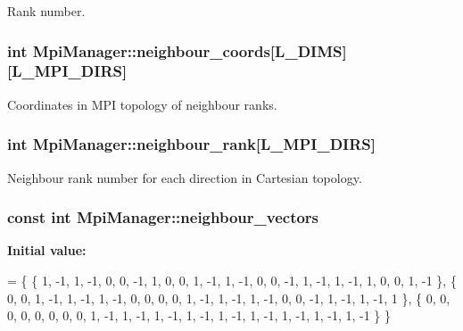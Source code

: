 Rank number. 

\subsubsection[{\texorpdfstring{neighbour\+\_\+coords}{neighbour_coords}}]{\setlength{\rightskip}{0pt plus 5cm}int Mpi\+Manager\+::neighbour\+\_\+coords\mbox{[}{\bf L\+\_\+\+D\+I\+MS}\mbox{]}\mbox{[}{\bf L\+\_\+\+M\+P\+I\+\_\+\+D\+I\+RS}\mbox{]}}\hypertarget{class_mpi_manager_a5a7268347fcab916adc61bee47e9f626}{}\label{class_mpi_manager_a5a7268347fcab916adc61bee47e9f626}


Coordinates in M\+PI topology of neighbour ranks. 

\subsubsection[{\texorpdfstring{neighbour\+\_\+rank}{neighbour_rank}}]{\setlength{\rightskip}{0pt plus 5cm}int Mpi\+Manager\+::neighbour\+\_\+rank\mbox{[}{\bf L\+\_\+\+M\+P\+I\+\_\+\+D\+I\+RS}\mbox{]}}\hypertarget{class_mpi_manager_af2891954ff504c12ec6d5f845e906f28}{}\label{class_mpi_manager_af2891954ff504c12ec6d5f845e906f28}


Neighbour rank number for each direction in Cartesian topology. 

\subsubsection[{\texorpdfstring{neighbour\+\_\+vectors}{neighbour_vectors}}]{\setlength{\rightskip}{0pt plus 5cm}const int Mpi\+Manager\+::neighbour\+\_\+vectors\hspace{0.3cm}{\ttfamily [static]}}\hypertarget{class_mpi_manager_a0c5f58ce12a1a8002cb124bf61e80d09}{}\label{class_mpi_manager_a0c5f58ce12a1a8002cb124bf61e80d09}
{\bfseries Initial value\+:}
\begin{DoxyCode}
= 
\{
    \{ 1, -1, 1, -1, 0, 0, -1, 1, 0, 0, 1, -1, 1, -1, 0, 0, -1, 1, -1, 1, -1, 1, 0, 0, 1, -1 \},
    \{ 0, 0, 1, -1, 1, -1, 1, -1, 0, 0, 0, 0, 1, -1, 1, -1, 1, -1, 0, 0, -1, 1, -1, 1, -1, 1 \},
    \{ 0, 0, 0, 0, 0, 0, 0, 0, 1, -1, 1, -1, 1, -1, 1, -1, 1, -1, 1, -1, 1, -1, 1, -1, 1, -1 \}
\}
\end{DoxyCode}



